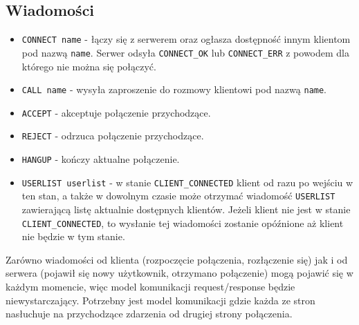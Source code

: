 \subsection*{Wiadomości}

\begin{itemize}
    \item \verb|CONNECT name| - łączy się z serwerem oraz ogłasza dostępność innym klientom pod
          nazwą \verb|name|. Serwer odsyła \verb|CONNECT_OK| lub \verb|CONNECT_ERR| z powodem dla
          którego nie można się połączyć.
    \item \verb|CALL name| - wysyła zaproszenie do rozmowy klientowi pod nazwą \verb|name|.
    \item \verb|ACCEPT| - akceptuje połączenie przychodzące.
    \item \verb|REJECT| - odrzuca połączenie przychodzące.
    \item \verb|HANGUP| - kończy aktualne połączenie.
    \item \verb|USERLIST userlist| - w stanie \verb|CLIENT_CONNECTED| klient od razu po wejściu w
          ten stan, a także w dowolnym czasie może otrzymać wiadomość \verb|USERLIST| zawierającą
          listę aktualnie dostępnych klientów. Jeżeli klient nie jest w stanie
          \verb|CLIENT_CONNECTED|, to wysłanie tej wiadomości zostanie opóźnione aż klient nie
          będzie w tym stanie.

\end{itemize}

Zarówno wiadomości od klienta (rozpoczęcie połączenia, rozłączenie się) jak i od serwera (pojawił
się nowy użytkownik, otrzymano połączenie) mogą pojawić się w każdym momencie, więc model
komunikacji request/response będzie niewystarczający. Potrzebny jest model komunikacji gdzie każda
ze stron nasłuchuje na przychodzące zdarzenia od drugiej strony połączenia.


